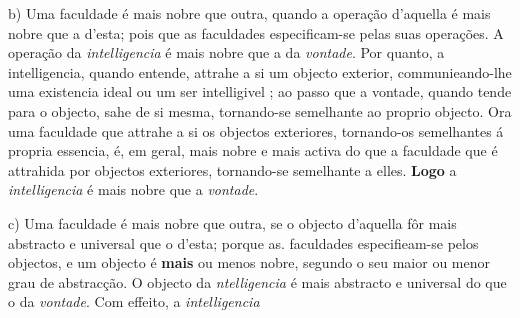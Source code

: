 b) Uma faculdade é mais nobre que outra, quando a operação d'aquella é mais nobre que a d'esta; pois que as faculdades   especificam-se pelas suas operações. A operação da \emph{intelligencia} é mais nobre que a da \emph{vontade}. Por quanto, a intelligencia, quando entende, attrahe a si um objecto exterior, communieando-lhe uma existencia ideal ou um ser intelligivel  ; ao passo que a vontade, quando tende para o objecto, sahe de si mesma, tornando-se semelhante ao proprio objecto. Ora uma faculdade que attrahe a si os objectos exteriores,   tornando-os semelhantes á propria essencia, é, em geral, mais nobre e mais activa do que a faculdade que é attrahida por objectos exteriores, tornando-se semelhante a elles. \textbf{Logo} a \emph{intelligencia} é mais nobre que a \emph{vontade}.

c) Uma faculdade é mais nobre que outra, se o objecto d'aquella fôr mais abstracto e universal que o d'esta; porque as. faculdades especifieam-se pelos objectos, e um objecto é \textbf{mais} ou menos nobre, segundo o seu maior ou menor grau   de abstracção. O objecto da \emph{ntelligencia} é mais abstracto e universal do que o da \emph{vontade}. Com effeito, a \emph{intelligencia}

